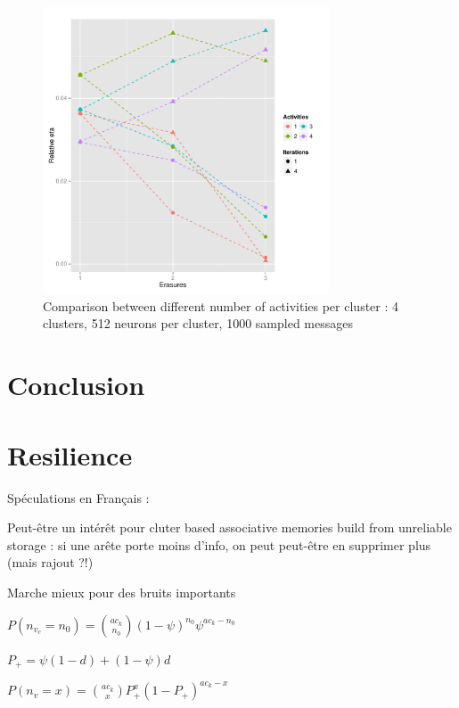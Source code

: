 \documentclass[english,11pt,twocolumn]{article}
\renewcommand{\ge}{\geqslant}
\theoremstyle{definition}
\begin{document}
		
		\begin{figure}
		\includegraphics[width=8.5cm]{Courbes/remplacement_figure4g1}
		\caption{Comparison between different number of activities per cluster :  4 clusters, 512 neurons per cluster, 1000 sampled messages}
	\end{figure}
		

	
	
	

	
	\section{Conclusion}	
	
	
	
	
	\section{Resilience}
	Spéculations en Français :
	
	Peut-être un intérêt pour cluter based associative memories build from unreliable storage : si une arête porte moins d'info, on peut peut-être en supprimer plus (mais rajout ?!)
	

	Marche mieux pour des bruits importants
	
	$P(n_{v_c} = n_0) = {a c_k \choose n_0} (1-\psi)^{n_0} \psi ^ { a c_k - n_0 }$
	
	$P_+ = \psi (1 - d) + (1 - \psi) d$
	
	$P(n_v = x) = {a c_k \choose x} P_+^x (1-P_+)^{a c_k -x }$

	
\end{document}
